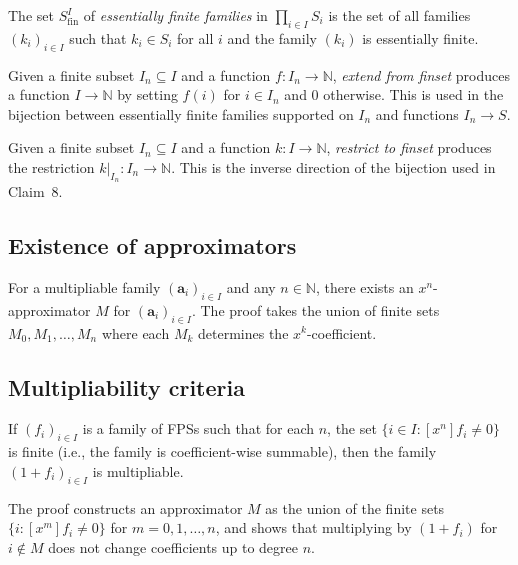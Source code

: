 \begin{definition}
\label{def.fps.infprod.SfinI}
\leanhelper
\leanok
The set $S^I_{\mathrm{fin}}$ of \emph{essentially finite families} in $\prod_{i \in I} S_i$
is the set of all families $(k_i)_{i \in I}$ such that $k_i \in S_i$ for all $i$ and
the family $(k_i)$ is essentially finite.
\end{definition}

\begin{definition}
\label{def.fps.infprod.extendFromFinset}
\leanhelper
\leanok
Given a finite subset $I_n \subseteq I$ and a function $f : I_n \to \mathbb{N}$,
\emph{extend from finset} produces a function $I \to \mathbb{N}$ by setting
$f(i)$ for $i \in I_n$ and $0$ otherwise. This is used in the bijection between
essentially finite families supported on $I_n$ and functions $I_n \to S$.
\end{definition}

\begin{definition}
\label{def.fps.infprod.restrictToFinset}
\leanhelper
\leanok
Given a finite subset $I_n \subseteq I$ and a function $k : I \to \mathbb{N}$,
\emph{restrict to finset} produces the restriction $k|_{I_n} : I_n \to \mathbb{N}$.
This is the inverse direction of the bijection used in Claim~8.
\end{definition}

\subsection{Existence of approximators}

\begin{lemma}
\label{lem.fps.mulable.approx.lean}
\leanhelper
\leanok
For a multipliable family $(\mathbf{a}_i)_{i \in I}$ and any $n \in \mathbb{N}$,
there exists an $x^n$-approximator $M$ for $(\mathbf{a}_i)_{i \in I}$.
The proof takes the union of finite sets $M_0, M_1, \ldots, M_n$ where each $M_k$
determines the $x^k$-coefficient.
\end{lemma}

\subsection{Multipliability criteria}

\begin{theorem}
\label{thm.fps.1+f-mulable.lean}
\leanhelper
\leanok
If $(f_i)_{i \in I}$ is a family of FPSs such that for each $n$,
the set $\{i \in I : [x^n] f_i \neq 0\}$ is finite (i.e., the family is
coefficient-wise summable), then the family $(1 + f_i)_{i \in I}$ is multipliable.

The proof constructs an approximator $M$ as the union of the finite sets
$\{i : [x^m] f_i \neq 0\}$ for $m = 0, 1, \ldots, n$, and shows that
multiplying by $(1 + f_i)$ for $i \notin M$ does not change coefficients up to degree $n$.
\end{theorem}

